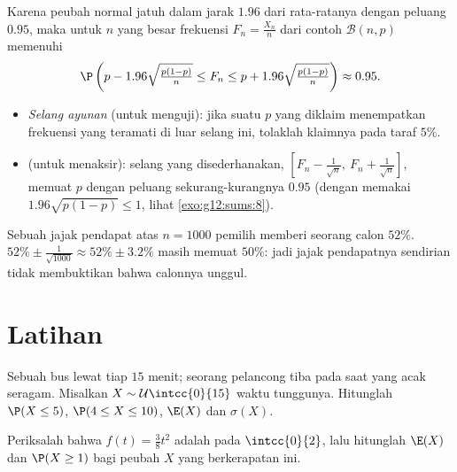 \begin{method}\label{met:g12:contdist:fluctuation}
Karena peubah normal jatuh dalam jarak $1.96$  dari rata-ratanya
dengan peluang $0.95$, maka untuk $n$ yang besar frekuensi
$F_n = \frac{X_n}{n}$ dari contoh $\mathcal B(n,p)$ memenuhi
\[
\P\left(p - 1.96\sqrt{\tfrac{p(1-p)}{n}} \leq F_n \leq
p + 1.96\sqrt{\tfrac{p(1-p)}{n}}\right) \approx 0.95 .
\]
\begin{itemize}
  \item \emph{Selang ayunan} (untuk menguji): jika suatu $p$ yang diklaim menempatkan
        frekuensi yang teramati di luar selang ini, tolaklah klaimnya pada
        taraf $5\%$.
  \item \emph{} (untuk menaksir): selang yang disederhanakan,
        $\left[F_n - \frac{1}{\sqrt n},\ F_n + \frac{1}{\sqrt n}\right]$,
        memuat $p$ dengan peluang sekurang-kurangnya $0.95$
        (dengan memakai $1.96\sqrt{p(1-p)} \leq 1$, lihat \cref{exo:g12:sums:8}).
\end{itemize}
\end{method}

\begin{example}\label{ex:g12:contdist:poll}
Sebuah jajak pendapat atas $n = 1000$ pemilih memberi seorang calon $52\%$.  $52\% \pm \frac{1}{\sqrt{1000}} \approx 52\% \pm 3.2\%$ masih
memuat $50\%$: jadi jajak pendapatnya sendirian tidak membuktikan bahwa calonnya
unggul.
\end{example}

\section{Latihan}

\begin{exercise}[$\star$]\label{exo:g12:contdist:1}
Sebuah bus lewat tiap $15$ menit; seorang pelancong tiba pada saat yang acak
seragam. Misalkan $X \sim \mathcal U\intcc{0}{15}$ waktu tunggunya. Hitunglah
$\P(X \leq 5)$, $\P(4 \leq X \leq 10)$, $\E(X)$ dan $\sigma(X)$.
\end{exercise}

\begin{exercise}[$\star$]\label{exo:g12:contdist:2}
Periksalah bahwa $f(t) = \frac{3}{8}t^2$ adalah  pada $\intcc{0}{2}$, lalu
hitunglah $\E(X)$ dan $\P(X \geq 1)$ bagi peubah $X$ yang berkerapatan ini.
\end{exercise}

